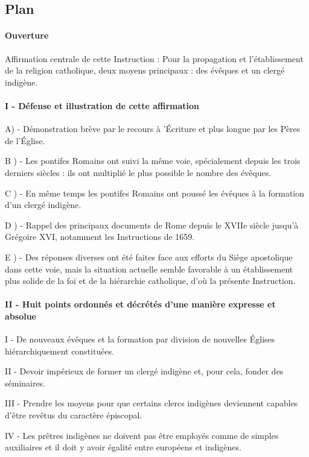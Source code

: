 \subsection{Plan}


\paragraph{Ouverture}
Affirmation centrale de cette Instruction :
Pour la propagation et l'établissement de la religion catholique,
deux moyens principaux : des évêques et un clergé indigène.
\paragraph{I - Défense et illustration de cette affirmation
}
A) - Démonstration brève par le recours à 'Écriture et plus longue par les
Pères de l'Église.

B ) - Les pontifes Romains ont suivi la même voie, spécialement depuis les
trois derniers siècles : ils ont multiplié le plus possible le nombre des évêques.

C ) - En même temps les pontifes Romains ont poussé les évêques à la formation
d'un clergé indigène.

D ) - Rappel des principaux documents de Rome depuis le XVIIe siècle jusqu'à
Grégoire XVI, notamment les Instructions de 1659.

E ) - Des réponses diverses ont été faites face aux efforts du Siège apostolique
dans cette voie, mais la situation actuelle semble favorable à un établissement
plus solide de la foi et de la hiérarchie catholique, d'où la présente Instruction.

\paragraph{II - Huit points ordonnés et décrétés d'une manière expresse et absolue}


I - De nouveaux évêques et la formation par division de nouvelles Églises hiérarchiquement
constituées.

II - Devoir impérieux de former un clergé indigène et, pour cela, fonder des
séminaires.

III - Prendre les moyens pour que certains clercs indigènes deviennent capables
d'être revêtus du caractère épiscopal.

IV - Les prêtres indigènes ne doivent pas être employés comme de simples
auxiliaires et il doit y avoir égalité entre européens et indigènes.

